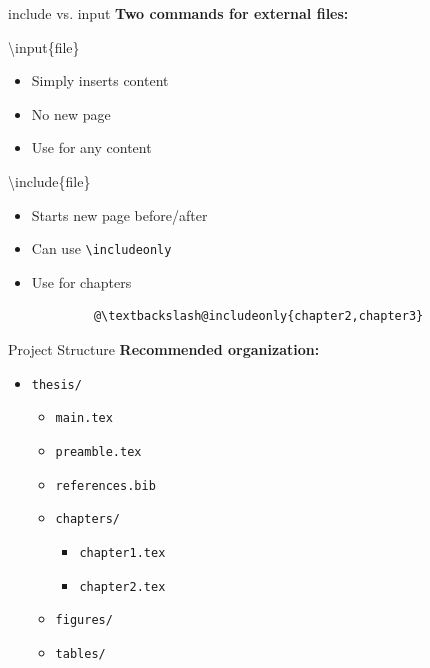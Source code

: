 \documentclass[aspectratio=169]{beamer}
\begin{document}
	\begin{frame}[fragile]{include vs. input}
		\textbf{Two commands for external files:}
		
		\begin{block}{\textbackslash input\{file\}}
			\begin{itemize}
				\item Simply inserts content
				\item No new page
				\item Use for any content
			\end{itemize}
		\end{block}
		
		\begin{block}{\textbackslash include\{file\}}
			\begin{itemize}
				\item Starts new page before/after
				\item Can use \texttt{\textbackslash includeonly}
				\item Use for chapters
			\end{itemize}
		\end{block}
		
		\begin{lstlisting}
			@\textbackslash@includeonly{chapter2,chapter3}
		\end{lstlisting}
	\end{frame}
	
	\begin{frame}{Project Structure}
		\textbf{Recommended organization:}
		
		\begin{itemize}
			\item \texttt{thesis/}
			\begin{itemize}
				\item \texttt{main.tex}
				\item \texttt{preamble.tex}
				\item \texttt{references.bib}
				\item \texttt{chapters/}
				\begin{itemize}
					\item \texttt{chapter1.tex}
					\item \texttt{chapter2.tex}
				\end{itemize}
				\item \texttt{figures/}
				\item \texttt{tables/}
			\end{itemize}
		\end{itemize}
	\end{frame}
	
\end{document}
